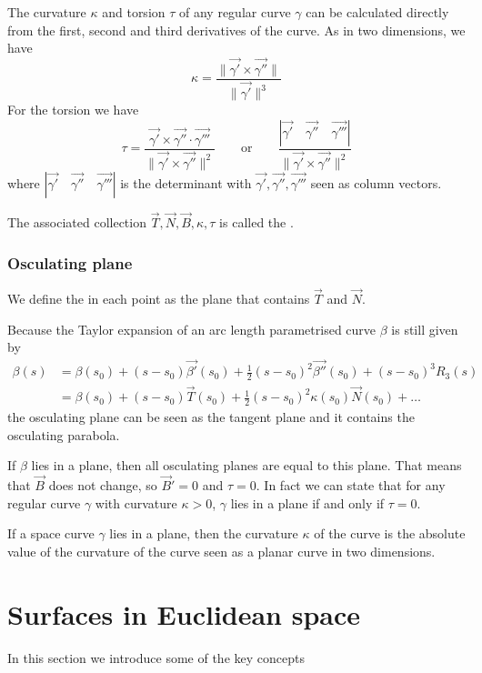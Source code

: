 The curvature $\kappa$ and torsion $\tau$ of any regular curve $\gamma$ can be calculated directly from the first, second and third derivatives of the curve. As in two dimensions, we have
\[ \kappa = \frac{\lVert \vec{\gamma'} \times \vec{\gamma''}\lVert}{\lVert\vec{\gamma'}\lVert^3} \]
For the torsion we have
\[ \tau = \frac{\vec{\gamma'}\times\vec{\gamma''}\cdot\vec{\gamma'''}}{\lVert\vec{\gamma'}\times\vec{\gamma''}\lVert^2} \qquad \text{or}\qquad \frac{|\vec{\gamma'}\quad\vec{\gamma''}\quad\vec{\gamma'''}|}{\lVert\vec{\gamma'}\times\vec{\gamma''}\lVert^2} \]
where $| \vec{\gamma'} \quad \vec{\gamma''}\quad \vec{\gamma'''}|$ is the determinant with $\vec{\gamma'},\vec{\gamma''}, \vec{\gamma'''}$ seen as column vectors.

The associated collection $\vec{T}, \vec{N}, \vec{B}, \kappa, \tau$ is called the .

\subsubsection{Osculating plane}
We define the  in each point as the plane that contains $\vec{T}$ and $\vec{N}$.

Because the Taylor expansion of an arc length parametrised curve $\beta$ is still given by
\begin{align*}
\beta(s) &= \beta(s_0) + (s-s_0)\vec{\beta'}(s_0) + \frac{1}{2}(s-s_0)^2\vec{\beta''}(s_0) + (s-s_0)^3R_3(s) \\
&= \beta(s_0) + (s-s_0)\vec{T}(s_0) + \frac{1}{2}(s-s_0)^2\kappa(s_0)\vec{N}(s_0) + \ldots
\end{align*}
the osculating plane can be seen as the tangent plane and it contains the osculating parabola.

If $\beta$ lies in a plane, then all osculating planes are equal to this plane. That means that $\vec{B}$ does not change, so $\vec{B}'= 0$ and $\tau = 0$. In fact we can state that for any regular curve $\gamma$ with curvature $\kappa > 0$, $\gamma$ lies in a plane if and only if $\tau = 0$.

If a space curve $\gamma$ lies in a plane, then the curvature $\kappa$ of the curve is the absolute value of the curvature of the curve seen as a planar curve in two dimensions.

\section{Surfaces in Euclidean space}
In this section we introduce some of the key concepts
